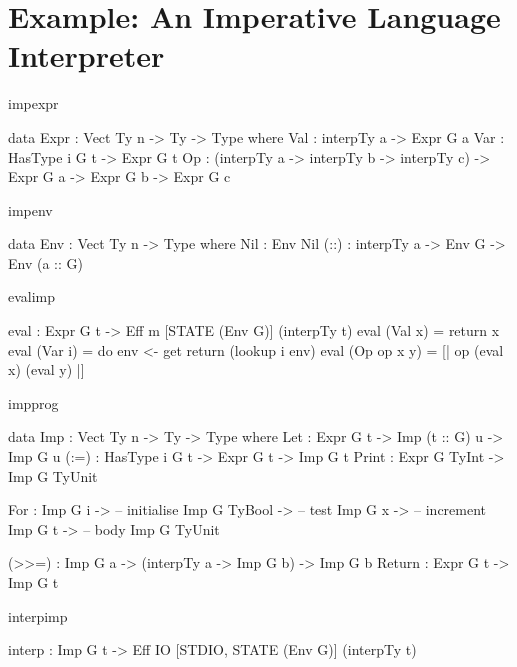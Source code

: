 \section{Example: An Imperative Language Interpreter}

\begin{SaveVerbatim}{impexpr}

data Expr : Vect Ty n -> Ty -> Type where
     Val : interpTy a -> Expr G a
     Var : HasType i G t -> Expr G t
     Op  : (interpTy a -> interpTy b -> interpTy c) ->
            Expr G a -> Expr G b -> Expr G c

\end{SaveVerbatim}

\begin{SaveVerbatim}{impenv}

data Env : Vect Ty n -> Type where
     Nil  : Env Nil
     (::) : interpTy a -> Env G -> Env (a :: G)

\end{SaveVerbatim}

\begin{SaveVerbatim}{evalimp}

eval : Expr G t -> Eff m [STATE (Env G)] (interpTy t)
eval (Val x) = return x
eval (Var i) = do env <- get
                  return (lookup i env) 
eval (Op op x y) = [| op (eval x) (eval y) |]

\end{SaveVerbatim}

\begin{SaveVerbatim}{impprog}

data Imp    : Vect Ty n -> Ty -> Type where
     Let    : Expr G t -> Imp (t :: G) u -> Imp G u
     (:=)   : HasType i G t -> Expr G t -> Imp G t
     Print  : Expr G TyInt -> Imp G TyUnit

     For    : Imp G i -> -- initialise
              Imp G TyBool -> -- test
              Imp G x -> -- increment
              Imp G t -> -- body
              Imp G TyUnit

     (>>=)  : Imp G a -> 
              (interpTy a -> Imp G b) -> Imp G b 
     Return : Expr G t -> Imp G t

\end{SaveVerbatim}

\begin{SaveVerbatim}{interpimp}

interp : Imp G t -> 
         Eff IO [STDIO, STATE (Env G)] (interpTy t)

\end{SaveVerbatim}


